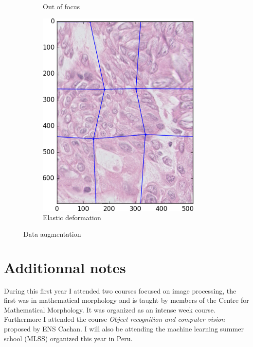 \documentclass[a4paper,10pt]{article}
\begin{document}
\begin{figure}
\begin{multicols}{3}
\begin{subfigure}{0.3\textwidth}
    \caption{Out of focus}
    \label{fig:blur}
	\end{subfigure}%
	\begin{subfigure}{0.3\textwidth}
    \includegraphics[width=0.9\textwidth]{ELAST.png}\par 
     \caption{Elastic deformation}
     \label{fig:elastic}
	\end{subfigure}%
\end{multicols}
\caption{Data augmentation}
\end{figure}

\section{Additionnal notes}

During this first year I attended two courses focused on image processing, the first was in mathematical morphology and is taught by members of the Centre for Mathematical Morphology. It was organized as an intense week course. Furthermore I attended the course \textit{Object recognition and computer vision} proposed by ENS Cachan. 
I will also be attending the machine learning summer school (MLSS) organized this year in Peru.
\end{document}
